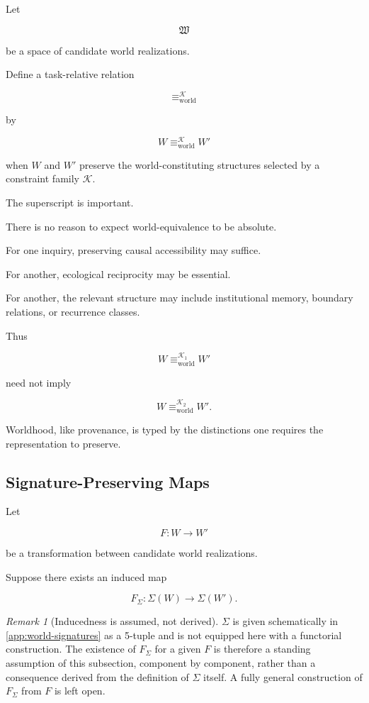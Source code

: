 \documentclass[
  11pt,
  a4paper,
  DIV=12,
  BCOR=0mm,
  parskip=half-
]{scrartcl}
\newcommand{\eqworld}{%
  \equiv_{\mathrm{world}}%
}
\theoremstyle{definition}
\theoremstyle{plain}
\theoremstyle{remark}
\newtheorem{remark}[definition]{Remark}
\begin{document}
Let

\[
  \mathfrak W
\]

be a space of candidate world realizations.

Define a task-relative relation

\[
  \eqworld^{\mathcal K}
\]

by

\[
  W\eqworld^{\mathcal K}W'
\]

when \(W\) and \(W'\) preserve the world-constituting structures selected by a
constraint family \(\mathcal K\).

The superscript is important.

There is no reason to expect world-equivalence to be absolute.

For one inquiry, preserving causal accessibility may suffice.

For another, ecological reciprocity may be essential.

For another, the relevant structure may include institutional memory,
boundary relations, or recurrence classes.

Thus

\[
  W\eqworld^{\mathcal K_1}W'
\]

need not imply

\[
  W\eqworld^{\mathcal K_2}W'.
\]

Worldhood, like provenance, is typed by the distinctions one requires the
representation to preserve.


\subsection{Signature-Preserving Maps}
\label{app:signature-preserving-maps}

Let

\[
  F:W\to W'
\]

be a transformation between candidate world realizations.

Suppose there exists an induced map

\[
  F_\Sigma:\Sigma(W)\to\Sigma(W').
\]

\begin{remark}[Inducedness is assumed, not derived]
\label{rem:F-sigma-assumed}
\(\Sigma\) is given schematically in \cref{app:world-signatures} as a
5-tuple and is not equipped here with a functorial construction. The
existence of \(F_\Sigma\) for a given \(F\) is therefore a standing
assumption of this subsection, component by component, rather than a
consequence derived from the definition of \(\Sigma\) itself. A fully
general construction of \(F_\Sigma\) from \(F\) is left open.
\end{remark}
\end{document}
